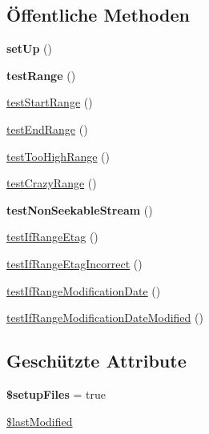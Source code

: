 \subsection*{Öffentliche Methoden}
\begin{DoxyCompactItemize}
\item 
\mbox{\label{class_sabre_1_1_d_a_v_1_1_server_range_test_a8f23a607a89714791f57c49d2ed186be}} 
{\bfseries set\+Up} ()
\item 
\mbox{\label{class_sabre_1_1_d_a_v_1_1_server_range_test_ad0a5b4255c9d33196504f4f9cb2a80fa}} 
{\bfseries test\+Range} ()
\item 
\mbox{\hyperlink{class_sabre_1_1_d_a_v_1_1_server_range_test_ae05e0b19393706d894bbd3f6a1f48f5b}{test\+Start\+Range}} ()
\item 
\mbox{\hyperlink{class_sabre_1_1_d_a_v_1_1_server_range_test_a65f7ca1baf32af79031d0f82f09d83e7}{test\+End\+Range}} ()
\item 
\mbox{\hyperlink{class_sabre_1_1_d_a_v_1_1_server_range_test_abff4c60a19a5d9204c51317211833151}{test\+Too\+High\+Range}} ()
\item 
\mbox{\hyperlink{class_sabre_1_1_d_a_v_1_1_server_range_test_af27ed655b5eb3eb30a0b7b202a2c8400}{test\+Crazy\+Range}} ()
\item 
\mbox{\label{class_sabre_1_1_d_a_v_1_1_server_range_test_ac27de8254fb48a6f3f7b8376f6d7244f}} 
{\bfseries test\+Non\+Seekable\+Stream} ()
\item 
\mbox{\hyperlink{class_sabre_1_1_d_a_v_1_1_server_range_test_aa812f78a39d476082ad455d039443edd}{test\+If\+Range\+Etag}} ()
\item 
\mbox{\hyperlink{class_sabre_1_1_d_a_v_1_1_server_range_test_a69a84d25eed78e5ae3846f7889f151c4}{test\+If\+Range\+Etag\+Incorrect}} ()
\item 
\mbox{\hyperlink{class_sabre_1_1_d_a_v_1_1_server_range_test_a5c6eebfd77e49fb95295a20153ce85ef}{test\+If\+Range\+Modification\+Date}} ()
\item 
\mbox{\hyperlink{class_sabre_1_1_d_a_v_1_1_server_range_test_a6523fe2e3f0a946d3eb35c4664a110f1}{test\+If\+Range\+Modification\+Date\+Modified}} ()
\end{DoxyCompactItemize}
\subsection*{Geschützte Attribute}
\begin{DoxyCompactItemize}
\item 
\mbox{\label{class_sabre_1_1_d_a_v_1_1_server_range_test_a1129d319ae000212245903149903cca1}} 
{\bfseries \$setup\+Files} = true
\item 
\mbox{\hyperlink{class_sabre_1_1_d_a_v_1_1_server_range_test_aed7a5de9e6fc12e9cbffe642a9943414}{\$last\+Modified}}
\end{DoxyCompactItemize}


